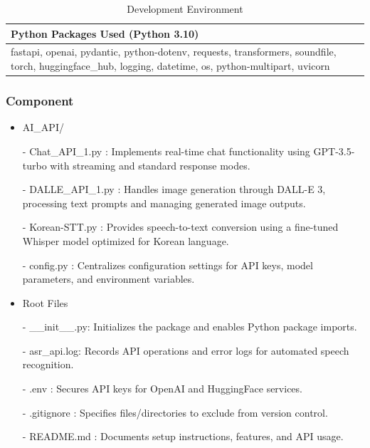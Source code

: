 \documentclass[conference]{IEEEtran}
\begin{document}
        \begin{table}[h!]
            \centering
            \caption{Development Environment}
            \begin{tabular}{|p{7.4cm}|}
                \hline
                \textbf{Python Packages Used (Python 3.10)} \\ 
                \hline
                fastapi, openai, pydantic, python-dotenv, requests, transformers, soundfile, torch, huggingface\_hub, logging, datetime, os, python-multipart, uvicorn \\ 
                \hline
            \end{tabular}
        \end{table}

            
            \subsubsection{Component}
                \begin{itemize}
                    \item AI\_API/
                        \item[-] Chat\_API\_1.py : Implements real-time chat functionality using GPT-3.5-turbo with streaming and standard response modes.
                        \item[-] DALLE\_API\_1.py : Handles image generation through DALL-E 3, processing text prompts and managing generated image outputs.
                        \item[-] 
                        Korean-STT.py : Provides speech-to-text conversion using a fine-tuned Whisper model optimized for Korean language.
                        \item[-] config.py : Centralizes configuration settings for API keys, model parameters, and environment variables.
                    \vspace{3mm}
                    
                    \item Root Files
                        \item[-]
                        \_\_init\_\_.py: Initializes the package and enables Python package imports.
                        \item[-] asr\_api.log: Records API operations and error logs for automated speech recognition.
                        \item[-] .env : Secures API keys for OpenAI and HuggingFace services.
                        \item[-] .gitignore : Specifies files/directories to exclude from version control.
                        \item[-] README.md : Documents setup instructions, features, and API usage.
                \end{itemize}
\end{document}
